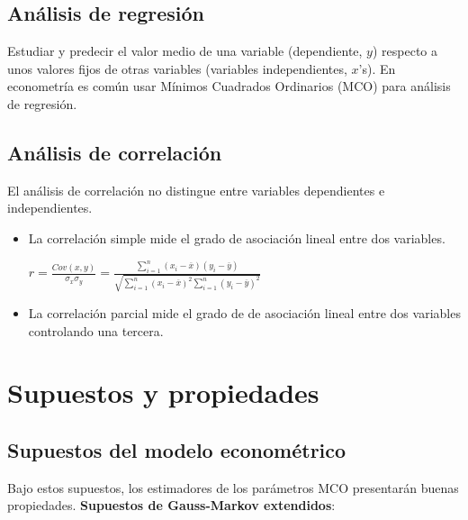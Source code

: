 \documentclass[10pt, a4paper, landscape]{extarticle}
\begin{document}
\begin{multicols}{3}
\subsection*{Análisis de regresión}
Estudiar y predecir el valor medio de una variable (dependiente, $y$) respecto a unos valores fijos de otras variables (variables independientes, $x$'s). En econometría es común usar Mínimos Cuadrados Ordinarios (MCO) para análisis de regresión.

\subsection*{Análisis de correlación}
El análisis de correlación no distingue entre variables dependientes e independientes.

\begin{itemize}[leftmargin=*]
\item La correlación simple mide el grado de asociación lineal entre dos variables.

\begin{center}
$r = \frac{Cov(x,y)}{\sigma_x \sigma_y} = \frac{\sum_{i=1}^n (x_i - \overline{x})(y_i - \overline{y})}{\sqrt{\sum_{i=1}^n (x_i - \overline{x})^2 \sum_{i=1}^n (y_i - \overline{y})^2}}$
\end{center}

\item La correlación parcial mide el grado de de asociación lineal entre dos variables controlando una tercera.
\end{itemize}

\columnbreak

\section*{Supuestos y propiedades}
\subsection*{Supuestos del modelo econométrico}

Bajo estos supuestos, los estimadores de los parámetros MCO presentarán buenas propiedades. \textbf{Supuestos de Gauss-Markov extendidos}:


\end{multicols}
\end{document}

